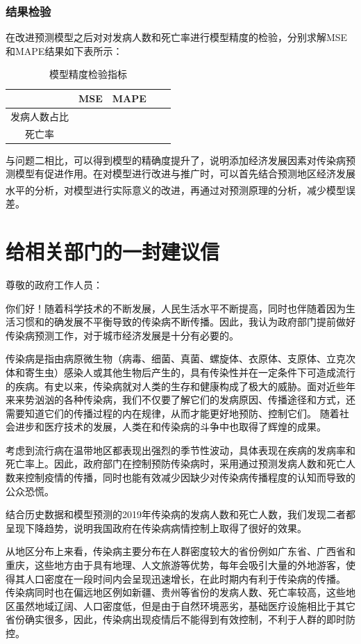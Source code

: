 \documentclass{whutmod}
\begin{document}
\subsubsection{结果检验}  
在改进预测模型之后对对发病人数和死亡率进行模型精度的检验，分别求解MSE和MAPE结果如下表所示：
\begin{table}[H]
    \caption{模型精度检验指标} \centering 
    \begin{tabular*}{8cm}{ccccc}
        \toprule[1.5pt]
         & MSE & MAPE \\
         \midrule[1pt]
         发病人数占比 &  &  \\
         死亡率 & & \\
         \bottomrule[1.5pt]
    \end{tabular*}
\end{table}
与问题二相比，可以得到模型的精确度提升了，说明添加经济发展因素对传染病预测模型有促进作用。在对模型进行改进与推广时，可以首先结合预测地区经济发展水平的分析\textsuperscript{\cite{bib:twelve}}，对模型进行实际意义的改进，再通过对预测原理的分析，减少模型误差。
\section{给相关部门的一封建议信}
\noindent 尊敬的政府工作人员：

你们好！随着科学技术的不断发展，人民生活水平不断提高，同时也伴随着因为生活习惯和的确发展不平衡导致的传染病不断传播。因此，我认为政府部门提前做好传染病预测工作，对于城市经济发展是十分有必要的。

传染病是指由病原微生物（病毒、细菌、真菌、螺旋体、衣原体、支原体、立克次体和寄生虫）感染人或其他生物后产生的，具有传染性并在一定条件下可造成流行的疾病。有史以来，传染病就对人类的生存和健康构成了极大的威胁。面对近些年来来势汹汹的各种传染病，我们不仅要了解它们的发病原因、传播途径和方式，还需要知道它们的传播过程的内在规律，从而才能更好地预防、控制它们。
随着社会进步和医疗技术的发展，人类在和传染病的斗争中也取得了辉煌的成果。

考虑到流行病在温带地区都表现出强烈的季节性波动，具体表现在疾病的发病率和死亡率上。因此，政府部门在控制预防传染病时，采用通过预测发病人数和死亡人数来控制疫情的传播，同时也能有效减少因缺少对传染病传播程度的认知而导致的公众恐慌。

结合历史数据和模型预测的2019年传染病的发病人数和死亡人数，我们发现二者都呈现下降趋势，说明我国政府在传染病病情控制上取得了很好的效果。

从地区分布上来看，传染病主要分布在人群密度较大的省份例如广东省、广西省和重庆，这些地方由于具有地理、人文旅游等优势，每年会吸引大量的外地游客，使得其人口密度在一段时间内会呈现迅速增长，在此时期内有利于传染病的传播。
传染病同时也在偏远地区例如新疆、贵州等省份的发病人数、死亡率较高，这些地区虽然地域辽阔、人口密度低，但是由于自然环境恶劣，基础医疗设施相比于其它省份确实很多，因此，传染病出现疫情后不能得到有效控制，不利于人群的即时防控。
\end{document}

